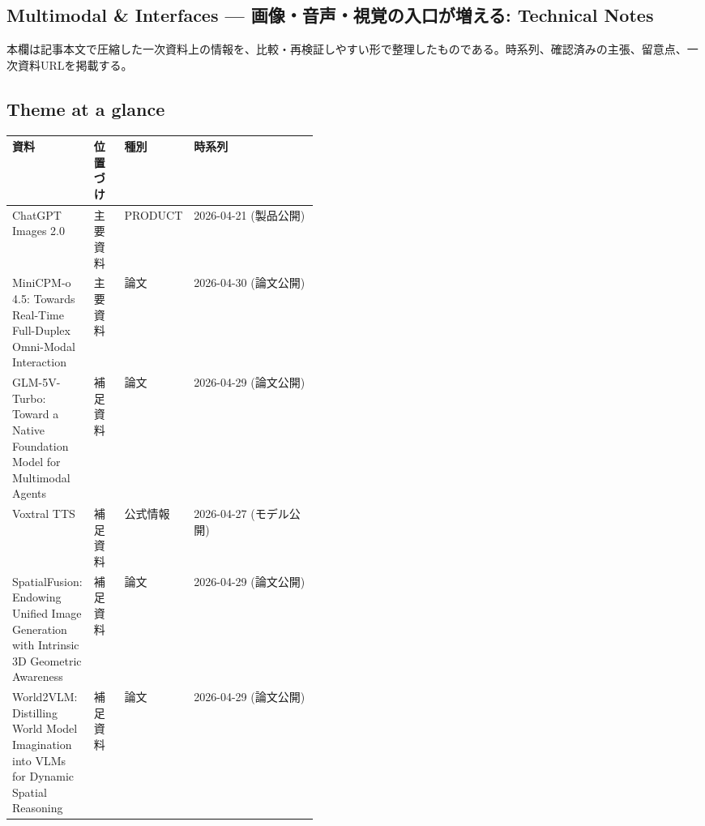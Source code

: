 \subsection*{Multimodal \& Interfaces — 画像・音声・視覚の入口が増える: Technical Notes}
本欄は記事本文で圧縮した一次資料上の情報を、比較・再検証しやすい形で整理したものである。時系列、確認済みの主張、留意点、一次資料URLを掲載する。
\medskip
\subsection*{Theme at a glance}
\begin{center}
\footnotesize
\begin{tabularx}{\linewidth}{@{}p{0.20\linewidth}p{0.10\linewidth}p{0.14\linewidth}X@{}}
\toprule
資料 & 位置づけ & 種別 & 時系列 \\
\midrule
ChatGPT Images 2.0 & 主要資料 & PRODUCT & 2026-04-21 (製品公開) \\
MiniCPM-o 4.5: Towards Real-Time Full-Duplex Omni-Modal Interaction & 主要資料 & 論文 & 2026-04-30 (論文公開) \\
GLM-5V-Turbo: Toward a Native Foundation Model for Multimodal Agents & 補足資料 & 論文 & 2026-04-29 (論文公開) \\
Voxtral TTS & 補足資料 & 公式情報 & 2026-04-27 (モデル公開) \\
SpatialFusion: Endowing Unified Image Generation with Intrinsic 3D Geometric Awareness & 補足資料 & 論文 & 2026-04-29 (論文公開) \\
World2VLM: Distilling World Model Imagination into VLMs for Dynamic Spatial Reasoning & 補足資料 & 論文 & 2026-04-29 (論文公開) \\
\bottomrule
\end{tabularx}
\end{center}
\normalsize

